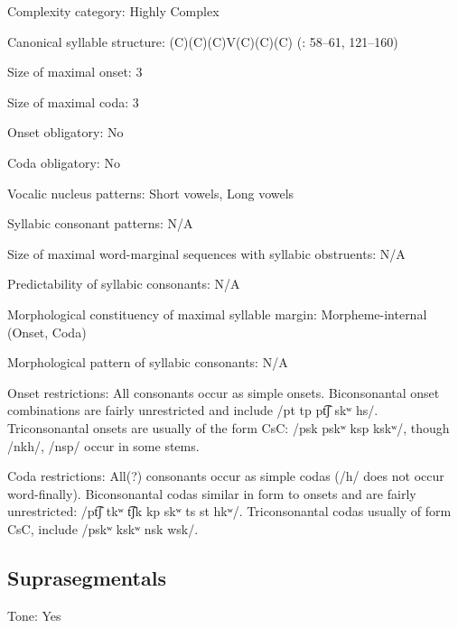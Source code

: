 {\begin{appendixdesc}
\item[Complexity category:] Highly Complex

\item[Canonical syllable structure:] (C)(C)(C)V(C)(C)(C) (\citealt{LeSourd1993}: 58--61, 121--160)

\item[Size of maximal onset:] 3

\item[Size of maximal coda:] 3

\item[Onset obligatory:] No

\item[Coda obligatory:] No

\item[Vocalic nucleus patterns:] Short vowels, Long vowels

\item[Syllabic consonant patterns:] N/A

\item[Size of maximal word-marginal sequences with syllabic obstruents:] N/A

\item[Predictability of syllabic consonants:] N/A

\item[Morphological constituency of maximal syllable margin:] Morpheme-internal (Onset, Coda)

\item[Morphological pattern of syllabic consonants:] N/A

\item[Onset restrictions:] All consonants occur as simple onsets. Biconsonantal onset combinations are fairly unrestricted and include /pt tp pt͡ʃ skʷ hs/. Triconsonantal onsets are usually of the form CsC: /psk pskʷ ksp kskʷ/, though /nkh/, /nsp/ occur in some stems.

\item[Coda restrictions:] All(?) consonants occur as simple codas (/h/ does not occur word-finally). Biconsonantal codas similar in form to onsets and are fairly unrestricted: /pt͡ʃ tkʷ t͡ʃk kp skʷ ts st hkʷ/. Triconsonantal codas usually of form CsC, include /pskʷ kskʷ nsk wsk/.
\end{appendixdesc}
\subsection*{Suprasegmentals}
\begin{appendixdesc}
\item[Tone:] Yes


\end{appendixdesc}}
